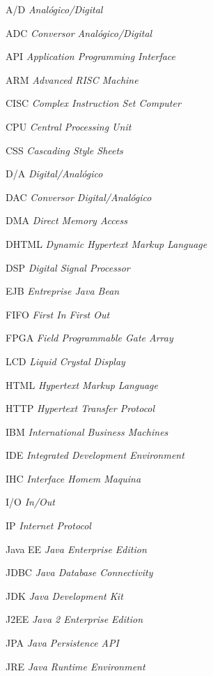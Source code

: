 \begin{siglas}

  \item[A/D] \textit{Analógico/Digital}
  \item[ADC] \textit{Conversor Analógico/Digital}
  \item[API] \textit{Application Programming Interface}
  \item[ARM] \textit{Advanced RISC Machine}
  \item[CISC] \textit{Complex Instruction Set Computer}
  \item[CPU] \textit{Central Processing Unit}
  \item[CSS] \textit{Cascading Style Sheets}
  \item[D/A] \textit{Digital/Analógico}
  \item[DAC] \textit{Conversor Digital/Analógico}
  \item[DMA] \textit{Direct Memory Access}
  \item[DHTML] \textit{Dynamic Hypertext Markup Language} 
  \item[DSP] \textit{Digital Signal Processor}
  \item[EJB] \textit{Entreprise Java Bean}
  \item[FIFO] \textit{First In First Out}
  \item[FPGA] \textit{Field Programmable Gate Array}
  \item[LCD] \textit{Liquid Crystal Display}
  \item[HTML] \textit{Hypertext Markup Language}
  \item[HTTP] \textit{Hypertext Transfer Protocol}
  \item[IBM] \textit{International Business Machines}
  \item[IDE] \textit{Integrated Development Environment}
  \item[IHC] \textit{Interface Homem Maquina}
  \item[I/O] \textit{In/Out}
  \item[IP] \textit{Internet Protocol}
  \item[Java EE] \textit{Java Enterprise Edition}
  \item[JDBC] \textit{Java Database Connectivity}
  \item[JDK] \textit{Java Development Kit}
  \item[J2EE] \textit{Java 2 Enterprise Edition}
  \item[JPA] \textit{Java Persistence API} 
  \item[JRE] \textit{Java Runtime Environment}

\end{siglas}
